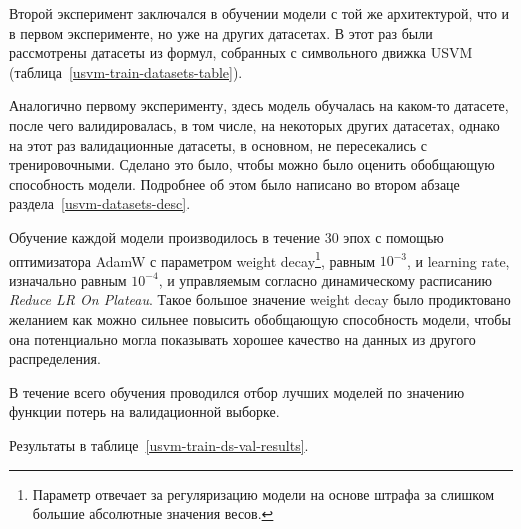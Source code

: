 Второй эксперимент заключался в обучении модели с той же архитектурой, что и в первом эксперименте, но уже на других датасетах. В этот раз были рассмотрены датасеты из формул, собранных с символьного движка USVM (таблица~\ref{usvm-train-datasets-table}).

Аналогично первому эксперименту, здесь модель обучалась на каком-то датасете, после чего валидировалась, в том числе, на некоторых других датасетах, однако на этот раз валидационные датасеты, в основном, не пересекались с тренировочными. Сделано это было, чтобы можно было оценить обобщающую способность модели. Подробнее об этом было написано во втором абзаце раздела~\ref{usvm-datasets-desc}.

Обучение каждой модели производилось в течение 30 эпох с помощью оптимизатора AdamW \cite{adamw-paper} с параметром weight decay\footnote{Параметр отвечает за регуляризацию модели на основе штрафа за слишком большие абсолютные значения весов.}, равным $10^{-3}$, и learning rate, изначально равным $10^{-4}$, и управляемым согласно динамическому расписанию \textit{Reduce LR On Plateau}. Такое большое значение weight decay было продиктовано желанием как можно сильнее повысить обобщающую способность модели, чтобы она потенциально могла показывать хорошее качество на данных из другого распределения.

В течение всего обучения проводился отбор лучших моделей по значению функции потерь на валидационной выборке.

Результаты в таблице~\ref{usvm-train-ds-val-results}.

